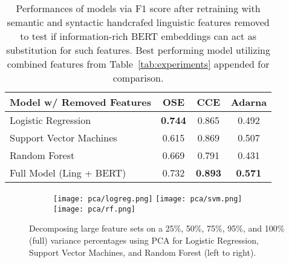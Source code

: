 \documentclass[11pt,a4paper]{article}
\begin{document}
\begin{table*}[!htbp]
    \centering
    \begin{tabular}{|l|c|c|c|}
    
    \hline \bf Model w/ Removed Features & \bf OSE & \bf CCE &\bf  Adarna \\  \hline
    
    Logistic Regression     & \bf 0.744     & 0.865     & 0.492 \\ \hline
    Support Vector Machines                     & 0.615     & 0.869     & 0.507 \\ \hline
    Random Forest           & 0.669     & 0.791     & 0.431 \\ \hline
    \hline
    Full Model (Ling + BERT) & 0.732     & \bf 0.893     & \bf 0.571 \\ \hline
    
    \end{tabular}
    

\caption{Performances of models via F1 score after retraining with semantic and syntactic handcrafed linguistic features removed to test if information-rich BERT embeddings can act as substitution for such features. Best performing model utilizing combined features from Table~\ref{tab:experiments} appended for comparison.}
\label{tab:substitution}
\end{table*}


\begin{figure*}[!htbp]
    \centering
    
    \begin{subfigure}[b]{\linewidth}
        \texttt{[image: pca/logreg.png]}\hfill
        \texttt{[image: pca/svm.png]}\hfill
        \texttt{[image: pca/rf.png]}
    \end{subfigure}


    \caption{Decomposing large feature sets on a 25\%, 50\%, 75\%, 95\%, and 100\% (full) variance percentages using PCA for Logistic Regression, Support Vector Machines, and Random Forest (left to right).}
    \label{fig:pca}
\end{figure*}
\end{document}
